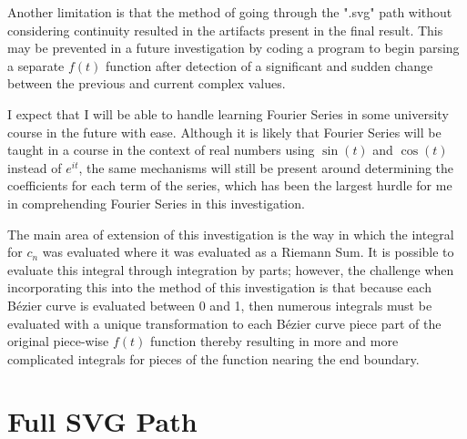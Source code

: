 \documentclass[letterpaper, 12pt]{article}
\begin{document}
Another limitation is that the method of
going through the ".svg" path without
considering continuity resulted in the artifacts present
in the final result. This may be
prevented in a future investigation
by coding a program to begin
parsing a separate \(f(t)\) function
after detection of a significant and sudden
change between the previous and current
complex values.

I expect that I will be able to handle learning
Fourier Series in some university course
in the future with ease. Although it is likely
that Fourier Series will be taught in a course
in the context of real numbers using
\(\sin(t)\) and \(\cos(t)\) instead of \(e^{it}\),
the same mechanisms will still be present around
determining the coefficients for each term of
the series, which has been the largest hurdle
for me in comprehending Fourier Series in this
investigation.

The main area of extension of this investigation
is the way in which the integral for \(c_n\) was
evaluated where it was evaluated as a Riemann Sum.
It is possible to evaluate this integral through
integration by parts; however, the challenge
when incorporating this into the method of this investigation
is that because each Bézier curve is evaluated
between 0 and 1, then numerous integrals
must be evaluated with a unique transformation
to each Bézier curve piece part of the original
piece-wise \(f(t)\) function thereby resulting
in more and more complicated integrals
for pieces of the function nearing the end boundary.




\appendix

\section{Full SVG Path} \label{app:fullSVG}
\end{document}
